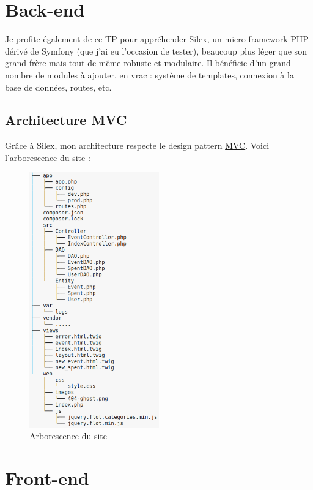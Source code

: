 \documentclass[a4paper, 12pt]{article}
\begin{document}
\section{Back-end}
Je profite également de ce TP pour appréhender Silex, un micro framework PHP dérivé de Symfony (que j'ai eu 
l'occasion de tester), beaucoup plus léger que son grand frère mais tout de même robuste et modulaire. Il bénéficie 
d'un grand nombre de modules à ajouter, en vrac : système de templates, connexion à la base de données, routes, etc.

\subsection{Architecture MVC}
Grâce à Silex, mon architecture respecte le design pattern \href{https://en.wikipedia.org/wiki/Model-view-controller}{MVC}.
Voici l'arborescence du site :
\begin{figure}
	\begin{center}
		\includegraphics[width=0.5\textwidth]{tree.png}
	\end{center}
	\caption{Arborescence du site}
\end{figure}


\section{Front-end}
\end{document}
